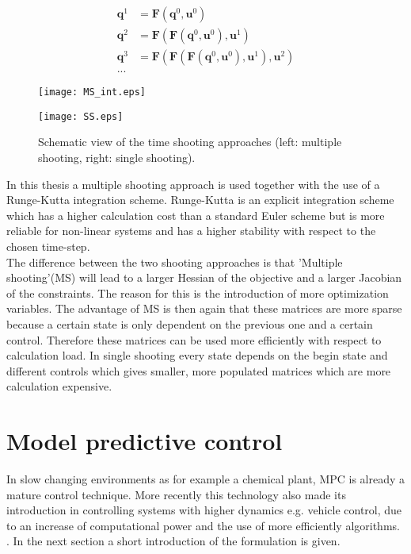 \begin{enumerate}
	\begin{equation}\label{eq:2}
	\begin{aligned}
	\bm{q}^1 &= \bm{F}(\bm{q}^0, \bm{u}^0)\\
	\bm{q}^2 &= \bm{F}(\bm{F}(\bm{q}^0, \bm{u}^0), \bm{u}^1)\\
	\bm{q}^3 &= \bm{F}(\bm{F}(\bm{F}(\bm{q}^0, \bm{u}^0), \bm{u}^1), \bm{u}^2)\\
	...
	\end{aligned}
	\end{equation}
\end{enumerate}

\begin{figure}[htp]
	\centering
	\begin{minipage}{0.49\textwidth}
		\centering
		\texttt{[image: MS\_int.eps]}
	\end{minipage}
	\hfill
	\begin{minipage}{.49\textwidth}
		\centering
		\texttt{[image: SS.eps]}
	\end{minipage}
	\caption{Schematic view of the time shooting approaches (left: multiple shooting, right: single shooting).}
	\label{fig:TS}
\end{figure}

In this thesis a multiple shooting approach is used together with the use of a Runge-Kutta integration scheme. Runge-Kutta is an explicit integration scheme which has a higher calculation cost than a standard Euler scheme but is more reliable for non-linear systems and has a higher stability with respect to the chosen time-step. \cite{Mercy2018}  \\ 

The difference between the two shooting approaches is that 'Multiple shooting'(MS) will lead to a larger Hessian of the objective and a larger Jacobian of the constraints. The reason for this is the introduction of more optimization variables. The advantage of MS is then again that these matrices are more sparse because a certain state is only dependent on the previous one and a certain control. Therefore these matrices can be used more efficiently with respect to calculation load. In single shooting every state depends on the begin state and different controls which gives smaller, more populated matrices which are more calculation expensive. \cite{Gillis2019}

\section{Model predictive control}
\label{s:MPC_e}
In slow changing environments as for example a chemical plant, MPC is already a mature control technique. More recently this technology also made its introduction in controlling systems with higher dynamics e.g. vehicle control, due to an increase of computational power and the use of more efficiently algorithms. \cite{Mercy2018}. In the next section a short introduction of the formulation is given. \\

